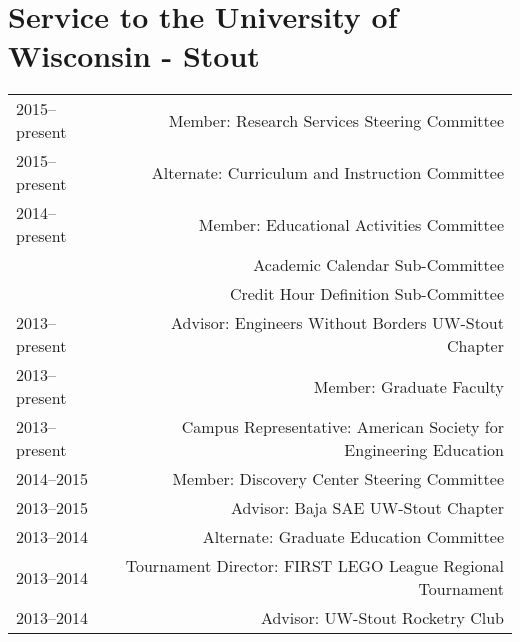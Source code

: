 \section*{Service to the University of Wisconsin - Stout}
\begin{tabular}{L!{\VRule}R}
2015--present&Member: Research Services Steering Committee \\
2015--present&Alternate: Curriculum and Instruction Committee \\
2014--present&Member: Educational Activities Committee \\
 &Academic Calendar Sub-Committee \\
 &Credit Hour Definition Sub-Committee \\
2013--present&Advisor: Engineers Without Borders UW-Stout Chapter \\
2013--present&Member: Graduate Faculty \\
2013--present&Campus Representative: American Society for Engineering Education\\
2014--2015&Member: Discovery Center Steering Committee \\
2013--2015&Advisor: Baja SAE UW-Stout Chapter \\
2013--2014&Alternate: Graduate Education Committee \\
2013--2014&Tournament Director: FIRST LEGO League Regional Tournament\\
2013--2014&Advisor: UW-Stout Rocketry Club\\
\end{tabular}